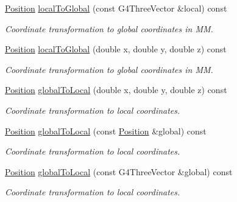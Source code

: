 \begin{DoxyCompactItemize}
\hyperlink{namespace_d_d4hep_1_1_simulation_ad6fd94b3439e31d1ba4b2e640d578558}{Position} \hyperlink{class_d_d4hep_1_1_simulation_1_1_geant4_step_handler_a8854ed1b3496d3630144f659f67d203e}{localToGlobal} (const G4ThreeVector \&local) const 
\begin{DoxyCompactList}\small\item\em Coordinate transformation to global coordinates in MM. \item\end{DoxyCompactList}\item 
\hyperlink{namespace_d_d4hep_1_1_simulation_ad6fd94b3439e31d1ba4b2e640d578558}{Position} \hyperlink{class_d_d4hep_1_1_simulation_1_1_geant4_step_handler_a6c3a63a6514cc13aace2f1d85ae3cef3}{localToGlobal} (double x, double y, double z) const 
\begin{DoxyCompactList}\small\item\em Coordinate transformation to global coordinates in MM. \item\end{DoxyCompactList}\item 
\hyperlink{namespace_d_d4hep_1_1_simulation_ad6fd94b3439e31d1ba4b2e640d578558}{Position} \hyperlink{class_d_d4hep_1_1_simulation_1_1_geant4_step_handler_af8c0b11ac1954f94db1e3bd785c76227}{globalToLocal} (double x, double y, double z) const 
\begin{DoxyCompactList}\small\item\em Coordinate transformation to local coordinates. \item\end{DoxyCompactList}\item 
\hyperlink{namespace_d_d4hep_1_1_simulation_ad6fd94b3439e31d1ba4b2e640d578558}{Position} \hyperlink{class_d_d4hep_1_1_simulation_1_1_geant4_step_handler_ab13cf409429a7de0f2ecec3b4c944578}{globalToLocal} (const \hyperlink{namespace_d_d4hep_1_1_simulation_ad6fd94b3439e31d1ba4b2e640d578558}{Position} \&global) const 
\begin{DoxyCompactList}\small\item\em Coordinate transformation to local coordinates. \item\end{DoxyCompactList}\item 
\hyperlink{namespace_d_d4hep_1_1_simulation_ad6fd94b3439e31d1ba4b2e640d578558}{Position} \hyperlink{class_d_d4hep_1_1_simulation_1_1_geant4_step_handler_a90c665198f858b7bc5989b7cd92fe774}{globalToLocal} (const G4ThreeVector \&global) const 
\begin{DoxyCompactList}\small\item\em Coordinate transformation to local coordinates. \item\end{DoxyCompactList}\item 

\end{DoxyCompactItemize}
